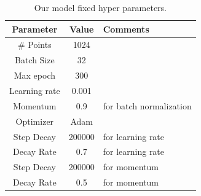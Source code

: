 \begin{table}[!tbh]
  \caption{Our model fixed hyper parameters.}
  \label{tab:para}
  \begin{tabular}{ccl}
    \toprule
    Parameter &Value & Comments\\
    \midrule
     \# Points & 1024 &  \\
     Batch Size & 32 &  \\
     Max epoch & 300 &  \\
     Learning rate &0.001  &  \\
     Momentum & 0.9 & for batch normalization  \\
     Optimizer & Adam &  \\
     Step Decay & 200000 & for learning rate  \\
     Decay Rate & 0.7 &  for learning rate \\           
     Step Decay & 200000 & for momentum  \\
     Decay Rate & 0.5 &   for momentum  \\     
  \bottomrule
\end{tabular}
\end{table}



